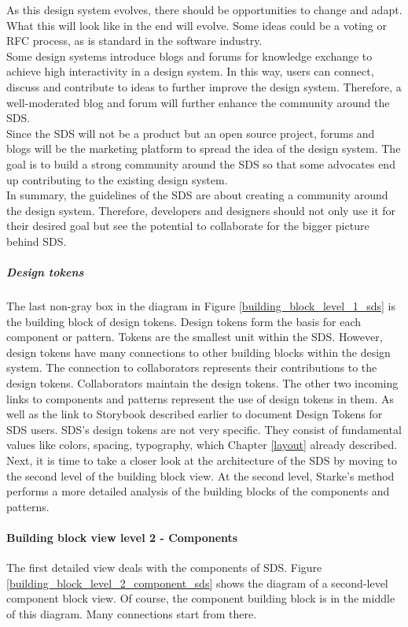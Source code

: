 As this design system evolves, there should be opportunities to change and adapt. What this will look like in the end will evolve. Some ideas could be a voting or \ac{RFC} process, as is standard in the software industry.  \\
Some design systems introduce blogs and forums for knowledge exchange to achieve high interactivity in a design system. In this way, users can connect, discuss and contribute to ideas to further improve the design system. Therefore, a well-moderated blog and forum will further enhance the community around the \ac{SDS}. \\
Since the \ac{SDS} will not be a product but an open source project, forums and blogs will be the marketing platform to spread the idea of the design system. The goal is to build a strong community around the \ac{SDS} so that some advocates end up contributing to the existing design system. \\
In summary, the guidelines of the \acl{SDS} are about creating a community around the design system. Therefore, developers and designers should not only use it for their desired goal but see the potential to collaborate for the bigger picture behind \ac{SDS}. 

\subparagraph{Design tokens}
The last non-gray box in the diagram in Figure \ref{building_block_level_1_sds} is the building block of design tokens. Design tokens form the basis for each component or pattern. Tokens are the smallest unit within the \ac{SDS}. However, design tokens have many connections to other building blocks within the design system. 
The connection to collaborators represents their contributions to the design tokens. Collaborators maintain the design tokens. The other two incoming links to components and patterns represent the use of design tokens in them. As well as the link to Storybook described earlier to document Design Tokens for \ac{SDS} users.
\ac{SDS}'s design tokens are not very specific. They consist of fundamental values like colors, spacing, typography, which Chapter \ref{layout} already described. \\

Next, it is time to take a closer look at the architecture of the SDS by moving to the second level of the building block view. At the second level, Starke's method performs a more detailed analysis of the building blocks of the components and patterns.

\paragraph{Building block view level 2 - Components} \label{architecture_componens}
The first detailed view deals with the components of \ac{SDS}. Figure \ref{building_block_level_2_component_sds} shows the diagram of a second-level component block view. Of course, the component building block is in the middle of this diagram. Many connections start from there. 


